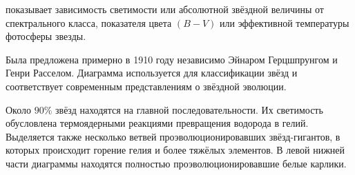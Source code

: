 	
 показывает зависимость светимости или абсолютной звёздной величины от спектрального класса, показателя цвета $(B-V)$ или эффективной температуры фотосферы звезды.

Была предложена примерно в 1910 году независимо Эйнаром Герцшпрунгом и Генри Расселом. Диаграмма используется для классификации звёзд и соответствует современным представлениям о звёздной эволюции.

Около $90 \%$ звёзд находятся на главной последовательности. Их светимость обусловлена термоядерными реакциями превращения водорода в гелий. Выделяется также несколько ветвей проэволюционировавших звёзд-гигантов, в которых происходит горение гелия и более тяжёлых элементов. В левой нижней части диаграммы находятся полностью проэволюционировавшие белые карлики.

